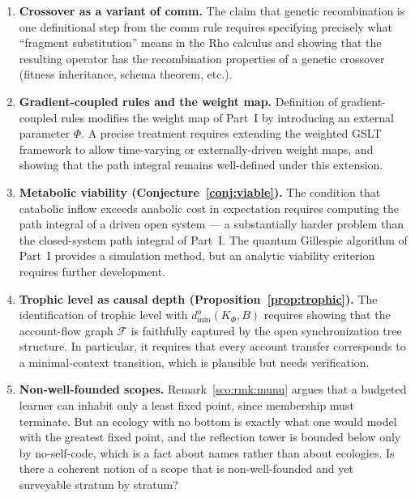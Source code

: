\begin{enumerate}[label=\textbf{Gap \arabic*.}, leftmargin=*, itemsep=8pt]
  \item \textbf{Crossover as a variant of comm.}
        The claim that genetic recombination is one definitional
        step from the comm rule requires specifying precisely what
        ``fragment substitution'' means in the Rho calculus and
        showing that the resulting operator has the recombination
        properties of a genetic crossover (fitness inheritance,
        schema theorem, etc.).

  \item \textbf{Gradient-coupled rules and the weight map.}
        Definition of gradient-coupled rules modifies the weight
        map of Part~I by introducing an external parameter $\Phi$.
        A precise treatment requires extending the weighted GSLT
        framework to allow time-varying or externally-driven weight
        maps, and showing that the path integral remains
        well-defined under this extension.

  \item \textbf{Metabolic viability (Conjecture~\ref{conj:viable}).}
        The condition that catabolic inflow exceeds anabolic cost
        in expectation requires computing the path integral of a
        driven open system --- a substantially harder problem than
        the closed-system path integral of Part~I.
        The quantum Gillespie algorithm of Part~I provides a
        simulation method, but an analytic viability criterion
        requires further development.

  \item \textbf{Trophic level as causal depth
        (Proposition~\ref{prop:trophic}).}
        The identification of trophic level with
        $d^o_{\min}(K_\Phi, B)$ requires showing that the
        account-flow graph $\mathcal{F}$ is faithfully captured
        by the open synchronization tree structure.
        In particular, it requires that every account transfer
        corresponds to a minimal-context transition, which is
        plausible but needs verification.

  \item \textbf{Non-well-founded scopes.}
        Remark~\ref{sco:rmk:munu} argues that a budgeted learner can
        inhabit only a least fixed point, since membership must
        terminate.
        But an ecology with no bottom is exactly what one would model
        with the greatest fixed point, and the reflection tower is
        bounded below only by no-self-code, which is a fact about
        names rather than about ecologies.
        Is there a coherent notion of a scope that is
        non-well-founded and yet surveyable stratum by stratum?


\end{enumerate}
